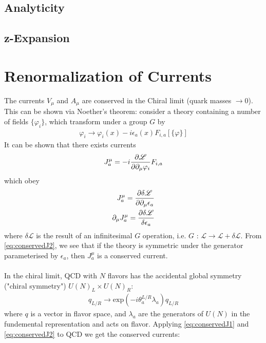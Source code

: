 \subsection{Analyticity}
\subsection{z-Expansion}


\section{Renormalization of Currents}


The currents $V_{\mu}$ and $A_{\mu}$ are conserved in the Chiral limit (quark masses $\rightarrow 0$). This can be shown via Noether's theorem: consider a theory containing a number of fields $\{\varphi_i\}$, which transform under a group $G$ by
\begin{align}
	\varphi_i \rightarrow \varphi_i (x) - i\epsilon_a (x) F_{i,a}[\{\varphi\}]
\end{align}
It can be shown that there exists currents
\begin{align}
	J_a^{\mu} = -i{\partial \mathscr{L} \over \partial\partial_{\mu} \varphi_i} F_{i,a}
\end{align}
which obey
\begin{align}
	\label{eq:conservedJ1}
	J^{\mu}_a = {\partial \delta \mathscr{L} \over \partial \partial_{\mu} \epsilon_a } \\
	\partial_{\mu} J^{\mu}_a = {\partial \delta \mathscr{L} \over \delta \epsilon_a}	
	\label{eq:conservedJ2}
\end{align}
where $\delta\mathscr{L}$ is the result of an infinitesimal $G$ operation, i.e. $G$ : $\mathscr{L} \rightarrow \mathscr{L} + \delta\mathscr{L}$. From \eqref{eq:conservedJ2}, we see that if the theory is symmetric under the generator parameterised by $\epsilon_a$, then $J_a^{\mu}$ is a conserved current.
\\ \\
In the chiral limit, QCD with $N$ flavors has the accidental global symmetry ("chiral symmetry") $U(N)_L\times U(N)_R$:
\begin{align}
	q_{L/R} \rightarrow \text{exp}(-i\theta_a^{L/R} \lambda_a) q_{L/R}
	\label{eq:LRtransform}
\end{align} 
where $q$ is a vector in flavor space, and $\lambda_a$ are the generators of $U(N)$ in the fundemental representation and acts on flavor. Applying \eqref{eq:conservedJ1} and \eqref{eq:conservedJ2} to QCD we get the conserved currents:
